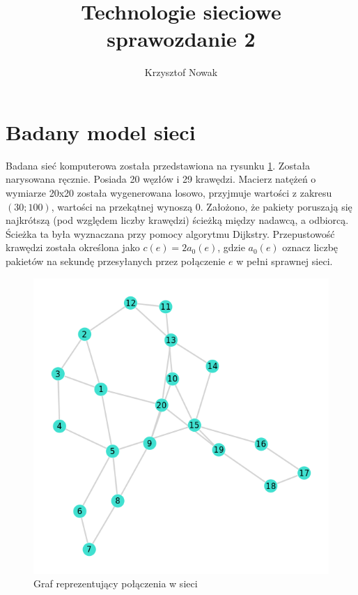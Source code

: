 \documentclass{article}
\title{Technologie sieciowe \\ sprawozdanie 2}
\author{Krzysztof Nowak}
\begin{document}
    \maketitle

    \section{Badany model sieci}
    Badana sieć komputerowa została przedstawiona na rysunku \ref{fig:graph}. Została narysowana ręcznie. Posiada 20 węzłów i 29 krawędzi. Macierz natężeń o wymiarze 20x20 została wygenerowana losowo, przyjmuje wartości z zakresu $(30; 100)$, wartości na przekątnej wynoszą 0.  Założono, że pakiety poruszają się najkrótszą (pod względem liczby krawędzi) ścieżką między nadawcą, a odbiorcą. Ścieżka ta była wyznaczana przy pomocy algorytmu Dijkstry. Przepustowość krawędzi została określona jako $c(e) = 2a_0(e)$, gdzie $a_0(e)$ oznacz liczbę pakietów na sekundę przesyłanych przez połączenie $e$ w pełni sprawnej sieci.

    \begin{figure}[h]
        \centering
        \includegraphics[width=12cm]{../network.png}
        \caption{Graf reprezentujący połączenia w sieci}
        \label{fig:graph}
    \end{figure}


\end{document}
